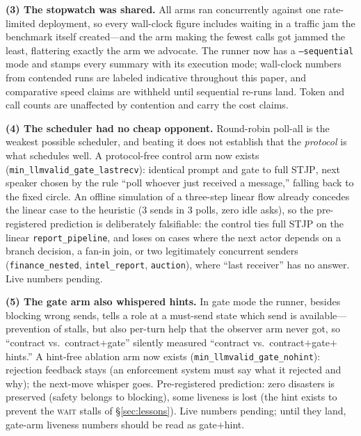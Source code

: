 \documentclass{article}
\newcommand{\stjp}{\textsc{STJP}}
\begin{document}
\textbf{(3) The stopwatch was shared.} All arms ran concurrently against one rate-limited deployment, so every wall-clock figure includes waiting in a traffic jam the benchmark itself created---and the arm making the fewest calls got jammed the least, flattering exactly the arm we advocate. The runner now has a \texttt{--sequential} mode and stamps every summary with its execution mode; wall-clock numbers from contended runs are labeled indicative throughout this paper, and comparative speed claims are withheld until sequential re-runs land. Token and call counts are unaffected by contention and carry the cost claims.

\textbf{(4) The scheduler had no cheap opponent.} Round-robin poll-all is the weakest possible scheduler, and beating it does not establish that the \emph{protocol} is what schedules well. A protocol-free control arm now exists (\texttt{min\_llmvalid\_gate\_lastrecv}): identical prompt and gate to full \stjp{}, next speaker chosen by the rule ``poll whoever just received a message,'' falling back to the fixed circle. An offline simulation of a three-step linear flow already concedes the linear case to the heuristic (3 sends in 3 polls, zero idle asks), so the pre-registered prediction is deliberately falsifiable: the control ties full \stjp{} on the linear \texttt{report\_pipeline}, and loses on cases where the next actor depends on a branch decision, a fan-in join, or two legitimately concurrent senders (\texttt{finance\_nested}, \texttt{intel\_report}, \texttt{auction}), where ``last receiver'' has no answer. Live numbers pending.

\textbf{(5) The gate arm also whispered hints.} In gate mode the runner, besides blocking wrong sends, tells a role at a must-send state which send is available---prevention of stalls, but also per-turn help that the observer arm never got, so ``contract vs.\ contract$+$gate'' silently measured ``contract vs.\ contract$+$gate$+$hints.'' A hint-free ablation arm now exists (\texttt{min\_llmvalid\_gate\_nohint}): rejection feedback stays (an enforcement system must say what it rejected and why); the next-move whisper goes. Pre-registered prediction: zero disasters is preserved (safety belongs to blocking), some liveness is lost (the hint exists to prevent the \textsc{wait} stalls of \S\ref{sec:lessons}). Live numbers pending; until they land, gate-arm liveness numbers should be read as gate$+$hint.
\end{document}
